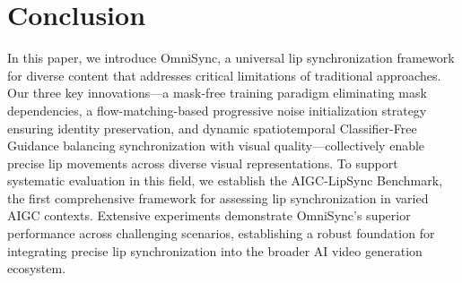 \section{Conclusion}
In this paper, we introduce OmniSync, a universal lip synchronization framework for diverse content that addresses critical limitations of traditional approaches. Our three key innovations—a mask-free training paradigm eliminating mask dependencies, a flow-matching-based progressive noise initialization strategy ensuring identity preservation, and dynamic spatiotemporal Classifier-Free Guidance balancing synchronization with visual quality—collectively enable precise lip movements across diverse visual representations. To support systematic evaluation in this field, we establish the AIGC-LipSync Benchmark, the first comprehensive framework for assessing lip synchronization in varied AIGC contexts. Extensive experiments demonstrate OmniSync's superior performance across challenging scenarios, establishing a robust foundation for integrating precise lip synchronization into the broader AI video generation ecosystem.

